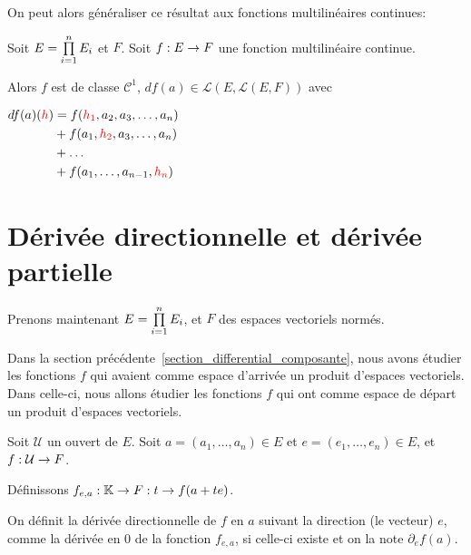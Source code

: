 On peut alors généraliser ce résultat aux fonctions multilinéaires continues:

\begin{proposition}
\label{multilinear_differential_application}
	Soit $E = \prod\limits_{i = 1}^{n} E_{i}$ et $F$.
	Soit $f : E \rightarrow F$ une fonction multilinéaire continue.

	Alors $f$ est de classe $\mathcal{C}^{1}$, 
	$df(a) \in \mathcal{L}(E, \mathcal{L}(E, F))$ avec 
	
	$
	\begin{aligned}
		df(a)(\textcolor{red}{h}) 
	&=	f(\textcolor{red}{h_{1}}, a_{2}, a_{3}, \ldots, a_{n}) \\
	&+	f(a_{1}, \textcolor{red}{h_{2}}, a_{3}, \ldots, a_{n}) \\
	&+	\ldots \\
	&+	f(a_{1}, \ldots, a_{n-1}, \textcolor{red}{h_{n}})
	\end{aligned}
	$
\end{proposition}
\section{Dérivée directionnelle et dérivée partielle}
\label{section_directionnal_partial_derivative}

Prenons maintenant $E = \prod\limits_{i = 1}^{n} E_{i}$, et $F$ des espaces vectoriels
normés.

Dans la section précédente~\ref{section_differential_composante}, nous avons
étudier les fonctions $f$ qui avaient comme espace d'arrivée un produit d'espaces
vectoriels. Dans celle-ci, nous allons étudier les fonctions $f$ qui ont comme
espace de départ un produit d'espaces vectoriels.


\begin{definition}
\label{directionnal_application_definition}
	Soit $\mathcal{U}$ un ouvert de $E$.
	Soit $a = (a_{1}, \ldots, a_{n}) \in E$ et $e = (e_{1}, \ldots, e_{n}) \in E$,
	et $f : \mathcal{U} \rightarrow F$.

	Définissons $f_{e, a} : \mathbb{K} \rightarrow F: t \rightarrow f(a + te)$.

	On définit la dérivée directionnelle de $f$ en $a$ suivant la direction (le
	vecteur) $e$, comme la dérivée en $0$ de la fonction $f_{e, a}$, si celle-ci
	existe et on la note ${\partial_{e} f}(a)$.

\end{definition}

